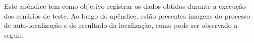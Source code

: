 
Este apêndice tem como objetivo registrar os dados obtidos durante a execução dos cenários de teste. Ao longo do apêndice, estão presentes
imagens do processo de auto-localização e do resultado da localização, como pode ser observado a seguir.







